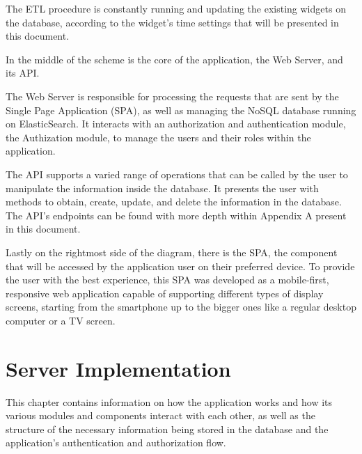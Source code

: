 \documentclass[a4paper,twoside,10pt]{report}
\begin{document}
The ETL procedure is constantly running and updating the existing widgets on the database, according to the widget's time settings that will be presented in this document.

In the middle of the scheme is the core of the application, the Web Server, and its API.

The Web Server is responsible for processing the requests that are sent by the Single Page Application (SPA), as well as managing the NoSQL database running on ElasticSearch\cite{ES}.
It interacts with an authorization and authentication module, the Authization module, to manage the users and their roles within the application.

The API supports a varied range of operations that can be called by the user to manipulate the information inside the database. It presents the user with methods to obtain, create, update, and delete the information in the database.
The API's endpoints can be found with more depth within Appendix A present in this document.

Lastly on the rightmost side of the diagram, there is the SPA, the component that will be accessed by the application user on their preferred device. To provide the user with the best experience, this SPA was developed as a mobile-first, responsive web application capable of supporting different types of display screens, starting from the smartphone up to the bigger ones like a regular desktop computer or a TV screen.

\chapter{Server Implementation}
This chapter contains information on how the application works and how its various modules and components interact with each other, as well as the structure of the necessary information being stored in the database and the application's authentication and authorization flow.
\end{document}
